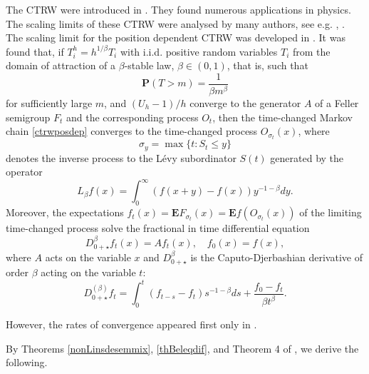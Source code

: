 \documentclass[12pt]{article}
\def\E{\mathbf{E}}
\def\P{\mathbf{P}}
\def\be{\beta}
\newcommand{\si}{\sigma}
\begin{document}
The CTRW were introduced in \cite{MW}. They found numerous applications in physics.
The scaling limits of these CTRW were analysed by many authors, see e.g. \cite{KKU}, \cite{MS}.
The scaling limit for the position dependent CTRW was developed in \cite{Kol7}.
It was found that, if $T_i^h=h^{1/\be} T_i$
with i.i.d. positive random variables $T_i$  from the domain
of attraction of a $\be$-stable law, $\be\in (0,1)$, that is,
 such that
\begin{equation}
\label{eq1propCTRW}
 \P (T>m)= \frac{1}{\be m^{\be}}
\end{equation}
for sufficiently large $m$,
and $(U_h-1)/h$ converge to the generator $A$ of a Feller semigroup $F_t$ and the corresponding process $O_t$,
then the time-changed Markov chain \eqref{ctrwposdep} converges to the time-changed process $O_{\si_t}(x)$, where
\[
 \si_y=\max \{t: S_t \le y\}
 \]
 denotes the inverse process to the L\'evy subordinator $S(t)$ generated by the operator
 \[
 L_{\be}f(x)=\int_0^{\infty}(f(x+y)-f(x))y^{-1-\be} dy.
 \]
Moreover, the expectations $f_t(x)= \E F_{\si_t}(x)=\E f(O_{\si_t}(x))$ of the limiting time-changed process
solve the fractional in time differential equation
\begin{equation}
\label{eqfraceq}
 D^{\be}_{0+\star}f_t(x)=Af_t(x), \quad f_0(x)=f(x),
\end{equation}
where $A$ acts on the variable $x$ and
$D^{\be}_{0+\star}$ is the Caputo-Djerbashian derivative of order $\be$ acting on the variable $t$:
\begin{equation}
\label{eqfraceq2}
 D^{(\be)}_{0+\star}f_t=\int_0^t (f_{t-s}-f_t)s^{-1-\be} ds+ \frac{f_0-f_t}{\be t^{\be}}.
\end{equation}

However, the rates of convergence
appeared first only in \cite{KolRates}.

By Theorems \ref{nonLinsdesemmix}, \ref{thBeleqdif},
and Theorem 4 of \cite{KolRates}, we derive the following.
\end{document}

